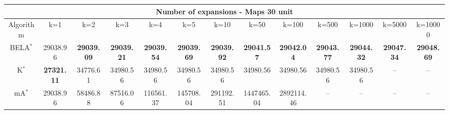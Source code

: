 \begin{tabular}{c|cccccccccccc}\toprule
\multicolumn{13}{c}{Number of expansions - Maps 30 unit}\\ \midrule
Algorithm & k=1 & k=2 & k=3 & k=4 & k=5 & k=10 & k=50 & k=100 & k=500 & k=1000 & k=5000 & k=10000 \\ \midrule
BELA$^*$ & 29038.96 & \textbf{29039.09} & \textbf{29039.21} & \textbf{29039.54} & \textbf{29039.69} & \textbf{29039.92} & \textbf{29041.57} & \textbf{29042.04} & \textbf{29043.77} & \textbf{29044.32} & \textbf{29047.34} & \textbf{29048.69} \\
K$^*$ & \textbf{27321.11} & 34776.61 & 34980.56 & 34980.56 & 34980.56 & 34980.56 & 34980.56 & 34980.56 & 34980.56 & 34980.56 & -- & -- \\
mA$^*$ & 29038.96 & 58486.88 & 87516.06 & 116561.37 & 145708.04 & 291192.51 & 1447465.04 & 2892114.46 & -- & -- & -- & -- \\ \bottomrule 
\end{tabular}
